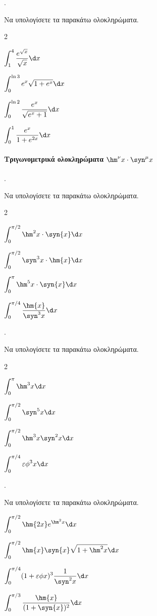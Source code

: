 \documentclass[11pt,a4paper,twocolumn]{article}
\newcounter{askhsh}
\newcommand{\askhsh}{\large\theaskhsh.\ \addtocounter{askhsh}{1}}
\begin{document}
\askhsh Να υπολογίσετε τα παρακάτω ολοκληρώματα.
\begin{multicols}{2}
\begin{alist}
\item $\displaystyle\int_{1}^{4} \dfrac{e^{\sqrt{x}}}{\sqrt{x}} \d x$
\item $\displaystyle\int_{0}^{\ln 3} e^x \sqrt{1+e^x} \d x$
\item $\displaystyle\int_{0}^{\ln 2} \dfrac{e^x}{\sqrt{e^x+1}} \d x$
\item $\displaystyle\int_{0}^{1} \dfrac{e^x}{1+e^{2x}} \d x$
\end{alist}
\end{multicols}

\paragraph{Τριγωνομετρικά ολοκληρώματα $\hm^\nu{x} \cdot \syn^\mu{x}$}
\askhsh Να υπολογίσετε τα παρακάτω ολοκληρώματα.
\begin{multicols}{2}
\begin{alist}
\item $\displaystyle\int_{0}^{\pi/2} \hm^2{x}\cdot \syn{x} \d x$
\item $\displaystyle\int_{0}^{\pi/2} \syn^3{x} \cdot\hm{x} \d x$
\item $\displaystyle\int_{0}^{\pi} \hm^5{x} \cdot\syn{x} \d x$
\item $\displaystyle\int_{0}^{\pi/4} \dfrac{\hm{x}}{\syn^3{x}} \d x$
\end{alist}
\end{multicols}

\askhsh Να υπολογίσετε τα παρακάτω ολοκληρώματα.
\begin{multicols}{2}
\begin{alist}
\item $\displaystyle\int_{0}^{\pi} \hm^3{x} \d x$
\item $\displaystyle\int_{0}^{\pi/2} \syn^5{x} \d x$
\item $\displaystyle\int_{0}^{\pi/2} \hm^3{x} \syn^2{x} \d x$
\item $\displaystyle\int_{0}^{\pi/4} \varepsilon\phi^3{x} \d x$
\end{alist}
\end{multicols}

\askhsh Να υπολογίσετε τα παρακάτω ολοκληρώματα.
\begin{alist}
\item $\displaystyle\int_{0}^{\pi/2} \hm{2x} e^{\hm^2{x}} \d x$
\item $\displaystyle\int_{0}^{\pi/2} \hm{x} \syn{x} \sqrt{1+\hm^2{x}} \d x$
\item $\displaystyle\int_{0}^{\pi/4} (1+\varepsilon\phi{x})^3 \dfrac{1}{\syn^2{x}} \d x$
\item $\displaystyle\int_{0}^{\pi/3} \dfrac{\hm{x}}{(1+\syn{x})^2} \d x$
\end{alist}
\end{document}
